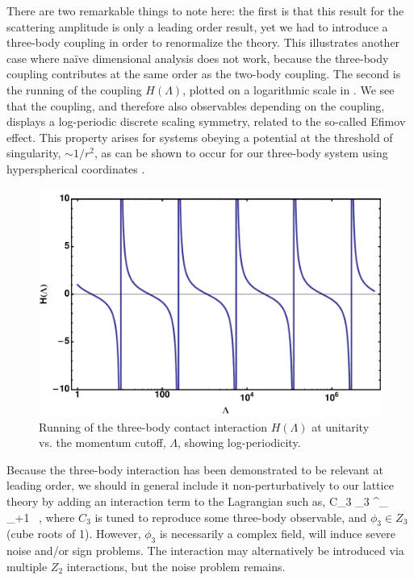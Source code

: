 There are two remarkable things to note here: the first is that this result for the scattering amplitude is only a leading order result, yet we had to introduce a three-body coupling in order to renormalize the theory. This illustrates another case where na\"ive dimensional analysis does not work, because the three-body coupling contributes at the same order as the two-body coupling. The second is the running of the coupling $H(\Lambda)$, plotted on a logarithmic scale in . We see that the coupling, and therefore also observables depending on the coupling, displays a log-periodic discrete scaling symmetry, related to the so-called Efimov effect. This property arises for systems obeying a potential at the threshold of singularity, $\sim 1/r^2$, as can be shown to occur for our three-body system using hyperspherical coordinates \cite{V1970563,Efimov:1971zz}.

\begin{figure}
\begin{center}
\includegraphics[width=0.5\linewidth]{Chapter5-figures/HLambda.pdf}
\end{center}
\caption{\label{fig:HLambda}Running of the three-body contact interaction $H(\Lambda)$ at unitarity vs. the momentum cutoff, $\Lambda$, showing log-periodicity.}
\end{figure}

Because the three-body interaction has been demonstrated to be relevant at leading order, we should in general include it non-perturbatively to our lattice theory by adding an interaction term to the Lagrangian such as,
\beq
C_3 \phi_3 \psi^{\dagger}_{\tau} \psi_{\tau+1} \ ,
\eeq
where $C_3$ is tuned to reproduce some three-body observable, and $\phi_3 \in Z_3$ (cube roots of 1). However, $\phi_3$ is necessarily a complex field, will induce severe noise and/or sign problems. The interaction may alternatively be introduced via multiple $Z_2$ interactions, but the noise problem remains.

